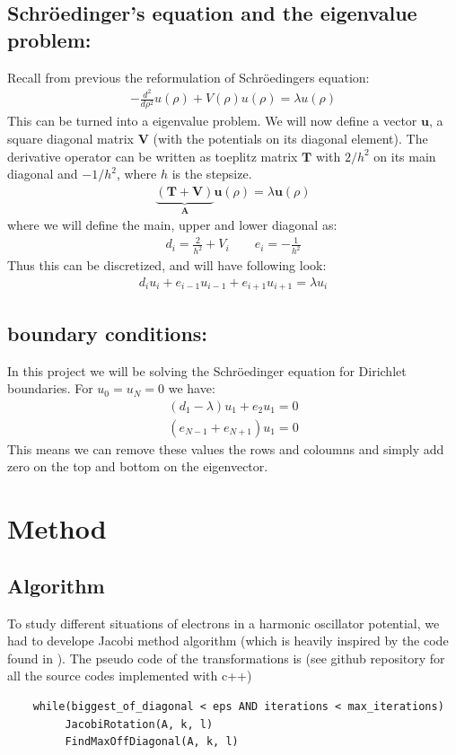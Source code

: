 \documentclass[a4paper, 10pt]{article}
\begin{document}
\subsection{Schröedinger's equation and the eigenvalue problem:}
Recall from previous the reformulation of Schröedingers equation:
\begin{align}
  -\frac{d^2}{d\rho^2}u(\rho)+V(\rho)u(\rho)=\lambda u(\rho)
\end{align}
This can be turned into a eigenvalue problem. We will now define a vector
$\mathbf{u}$, a square diagonal matrix $\mathbf{V}$ (with the potentials on its diagonal element).
The derivative operator can be written as toeplitz matrix $\mathbf{T}$ with $2/h^{2}$ on its main diagonal
and $-1/h^{2}$, where $h$ is the stepsize.
\begin{align}
  \label{matrix form}
\underbrace{\left(\mathbf{T} + \mathbf{V}\right)}_{\mathbf{A}}\mathbf{u}(\rho) = \lambda\mathbf{u}(\rho)
\end{align}
where we will define the main, upper and lower diagonal as:
\begin{align}
  d_{i} = \frac{2}{h^{2}} + V_{i} \qquad e_{i} = -\frac{1}{h^{2}}
\end{align}
Thus this can be discretized, and will have following look:
\begin{align}
  d_{i}u_{i} + e_{i-1}u_{i-1} + e_{i+1}u_{i+1} = \lambda u_{i}
\end{align}
\subsection{boundary conditions:} In this project we will be solving the
Schröedinger equation for Dirichlet boundaries. For $u_{0} = u_{N} = 0$ we have:
\begin{align}
(d_{1} - \lambda)u_{1} + e_{2}u_{1} = 0
\end{align}
\begin{align}
(e_{N-1} + e_{N+1})u_{1} = 0
\end{align}
This means we can remove these values the rows and coloumns and simply add zero
on the top and bottom on the eigenvector.

\section{Method}
\subsection{Algorithm}
To study different situations of electrons in a harmonic oscillator potential,
we had to develope Jacobi method algorithm (which is heavily inspired by the code found in
\cite{morten2}). The pseudo code of the
transformations is (see github repository for all the source codes implemented
with c++)
\begin{lstlisting}
	while(biggest_of_diagonal < eps AND iterations < max_iterations)
         JacobiRotation(A, k, l)
         FindMaxOffDiagonal(A, k, l)
\end{lstlisting}
\end{document}
